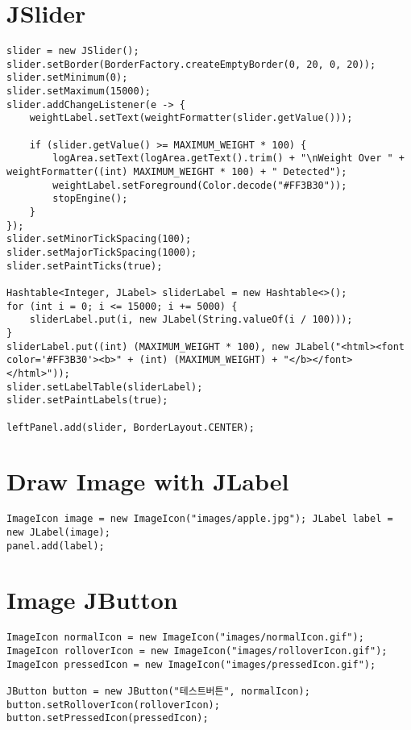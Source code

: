 \section{JSlider}
\begin{verbatim}
slider = new JSlider();
slider.setBorder(BorderFactory.createEmptyBorder(0, 20, 0, 20));
slider.setMinimum(0);
slider.setMaximum(15000);
slider.addChangeListener(e -> {
    weightLabel.setText(weightFormatter(slider.getValue()));

    if (slider.getValue() >= MAXIMUM_WEIGHT * 100) {
        logArea.setText(logArea.getText().trim() + "\nWeight Over " + weightFormatter((int) MAXIMUM_WEIGHT * 100) + " Detected");
        weightLabel.setForeground(Color.decode("#FF3B30"));
        stopEngine();
    }
});
slider.setMinorTickSpacing(100);
slider.setMajorTickSpacing(1000);
slider.setPaintTicks(true);

Hashtable<Integer, JLabel> sliderLabel = new Hashtable<>();
for (int i = 0; i <= 15000; i += 5000) {
    sliderLabel.put(i, new JLabel(String.valueOf(i / 100)));
}
sliderLabel.put((int) (MAXIMUM_WEIGHT * 100), new JLabel("<html><font color='#FF3B30'><b>" + (int) (MAXIMUM_WEIGHT) + "</b></font></html>"));
slider.setLabelTable(sliderLabel);
slider.setPaintLabels(true);

leftPanel.add(slider, BorderLayout.CENTER);
\end{verbatim}

\section{Draw Image with JLabel}
\begin{verbatim}
ImageIcon image = new ImageIcon("images/apple.jpg"); JLabel label = new JLabel(image);
panel.add(label);
\end{verbatim}

\section{Image JButton}
\begin{verbatim}
ImageIcon normalIcon = new ImageIcon("images/normalIcon.gif");
ImageIcon rolloverIcon = new ImageIcon("images/rolloverIcon.gif");
ImageIcon pressedIcon = new ImageIcon("images/pressedIcon.gif");

JButton button = new JButton("테스트버튼", normalIcon);
button.setRolloverIcon(rolloverIcon);
button.setPressedIcon(pressedIcon);
\end{verbatim}

